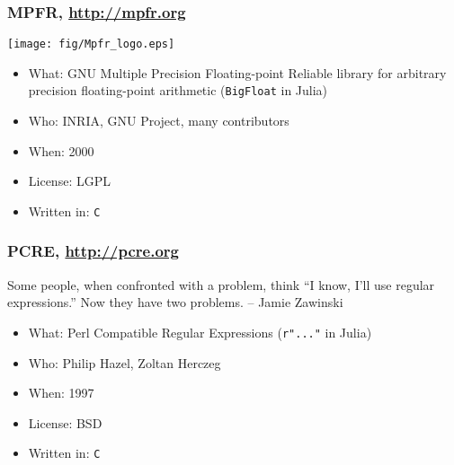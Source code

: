 \documentclass[compressed,dvips,letter]{beamer}
\begin{document}
\begin{frame}\frametitle{MPFR, \url{http://mpfr.org}}

\begin{center}
\texttt{[image: fig/Mpfr\_logo.eps]}
\end{center}
\begin{itemize}
\item What: GNU Multiple Precision Floating-point Reliable library for arbitrary precision floating-point arithmetic (\texttt{BigFloat} in Julia)
\item Who: INRIA, GNU Project, many contributors
\item When: 2000
\item License: LGPL
\item Written in: \texttt{C}
\end{itemize}

\end{frame}

%
%

\begin{frame}\frametitle{PCRE, \url{http://pcre.org}}

\begin{block}
\footnotesize
Some people, when confronted with a problem, think ``I know, I'll use regular expressions.'' Now they have two problems. -- Jamie Zawinski
\end{block}

\begin{itemize}
\item What: Perl Compatible Regular Expressions (\texttt{r"..."} in Julia)
\item Who: Philip Hazel, Zoltan Herczeg
\item When: 1997
\item License: BSD
\item Written in: \texttt{C}
\end{itemize}

\end{frame}

%
%
\end{document}
